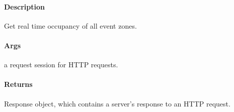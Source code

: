 \documentclass[letterpaper,10pt,english]{sphinxmanual}
\begin{document}
\begin{fulllineitems}
\label{\detokenize{gemini_lidar_hub_API:gemini_lidar_hub_API.get_lidar_hub_event_realtime}}
\pysigstartsignatures
{}
\pysigstopsignatures

\paragraph{Description}
\label{\detokenize{gemini_lidar_hub_API:id17}}
\sphinxAtStartPar
Get real time occupancy of all event zones.


\paragraph{Args}
\label{\detokenize{gemini_lidar_hub_API:id18}}\begin{description}
\sphinxAtStartPar
a request session for HTTP requests.

\end{description}


\paragraph{Returns}
\label{\detokenize{gemini_lidar_hub_API:id19}}\begin{description}
\sphinxAtStartPar
Response object, which contains a server’s response to an HTTP request.

\end{description}

\end{fulllineitems}

\end{document}
